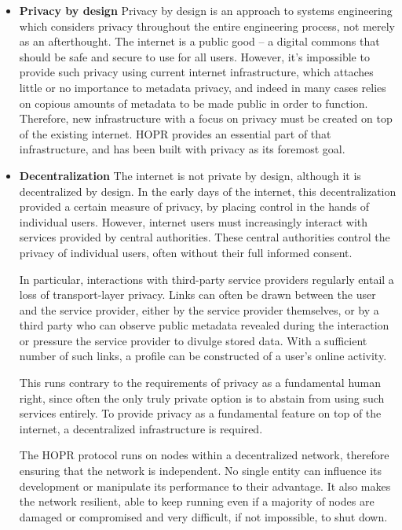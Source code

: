\begin{itemize}

    \item \textbf{Privacy by design}
          Privacy by design is an approach to systems engineering which considers privacy throughout the entire engineering process, not merely as an afterthought. The internet is a public good – a digital commons that should be safe and secure to use for all users. However, it's impossible to provide such privacy using current internet infrastructure, which attaches little or no importance to metadata privacy, and indeed in many cases relies on copious amounts of metadata to be made public in order to function. Therefore, new infrastructure with a focus on privacy must be created on top of the existing internet. HOPR provides an essential part of that infrastructure, and has been built with privacy as its foremost goal.

    \item \textbf{Decentralization}
          The internet is not private by design, although it is decentralized by design. In the early days of the internet, this decentralization provided a certain measure of privacy, by placing control in the hands of individual users. However, internet users must increasingly interact with services provided by central authorities. These central authorities control the privacy of individual users, often without their full informed consent.

          In particular, interactions with third-party service providers regularly entail a loss of transport-layer privacy. Links can often be drawn between the user and the service provider, either by the service provider themselves, or by a third party who can observe public metadata revealed during the interaction or pressure the service provider to divulge stored data. With a sufficient number of such links, a profile can be constructed of a user's online activity.

          This runs contrary to the requirements of privacy as a fundamental human right, since often the only truly private option is to abstain from using such services entirely. To provide privacy as a fundamental feature on top of the internet, a decentralized infrastructure is required.

          The HOPR protocol runs on nodes within a decentralized network, therefore ensuring that the network is independent. No single entity can influence its development or manipulate its performance to their advantage. It also makes the network resilient, able to keep running even if a majority of nodes are damaged or compromised and very difficult, if not impossible, to shut down.


\end{itemize}
